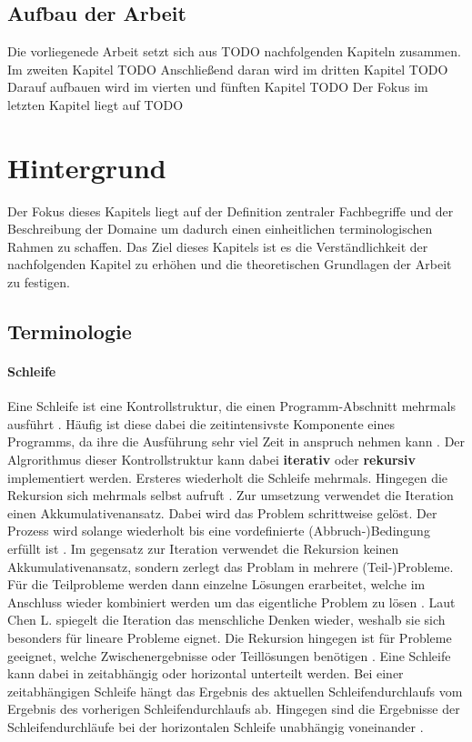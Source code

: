 \documentclass{article}
\begin{document}
    \subsection{Aufbau der Arbeit}
    Die vorliegenede Arbeit setzt sich aus TODO nachfolgenden Kapiteln zusammen. 
    Im zweiten Kapitel TODO
    Anschließend daran wird im dritten Kapitel TODO
    Darauf aufbauen wird im vierten und fünften Kapitel TODO
    Der Fokus im letzten Kapitel liegt auf TODO 
    \newpage
    \section{Hintergrund}
    Der Fokus dieses Kapitels liegt auf der Definition zentraler Fachbegriffe und der Beschreibung der Domaine um dadurch einen einheitlichen terminologischen Rahmen zu schaffen. 
    Das Ziel dieses Kapitels ist es die Verständlichkeit der nachfolgenden Kapitel zu erhöhen und die theoretischen Grundlagen der Arbeit zu festigen.
    \subsection{Terminologie}
    \label{Terminologie}
    \paragraph{Schleife}
    Eine Schleife ist eine Kontrollstruktur, die einen Programm-Abschnitt mehrmals ausführt \cite{22}.
    Häufig ist diese dabei die zeitintensivste Komponente eines Programms, da ihre die Ausführung sehr viel Zeit in anspruch nehmen kann \cite{1}.
    Der Algrorithmus dieser Kontrollstruktur kann dabei \textbf{iterativ} oder \textbf{rekursiv} implementiert werden. Ersteres wiederholt die Schleife mehrmals. Hingegen die Rekursion sich mehrmals selbst aufruft \cite{3}.
    Zur umsetzung verwendet die Iteration einen Akkumulativenansatz. Dabei wird das Problem schrittweise gelöst. Der Prozess wird solange wiederholt bis eine vordefinierte (Abbruch-)Bedingung erfüllt ist \cite{3}.
    Im gegensatz zur Iteration verwendet die Rekursion keinen Akkumulativenansatz, sondern zerlegt das Problam in mehrere (Teil-)Probleme. Für die Teilprobleme werden dann einzelne Lösungen erarbeitet, welche im Anschluss wieder kombiniert werden um das eigentliche Problem zu lösen \cite{3}.
    Laut Chen L. spiegelt die Iteration das menschliche Denken wieder, weshalb sie sich besonders für lineare Probleme eignet. 
    Die Rekursion hingegen ist für Probleme geeignet, welche Zwischenergebnisse oder Teillösungen benötigen \cite{3}.
    Eine Schleife kann dabei in zeitabhängig oder horizontal unterteilt werden. Bei einer zeitabhängigen Schleife hängt das Ergebnis des aktuellen Schleifendurchlaufs vom Ergebnis des vorherigen Schleifendurchlaufs ab. Hingegen sind die Ergebnisse der Schleifendurchläufe bei der horizontalen Schleife unabhängig voneinander \cite{5}.
\end{document}
